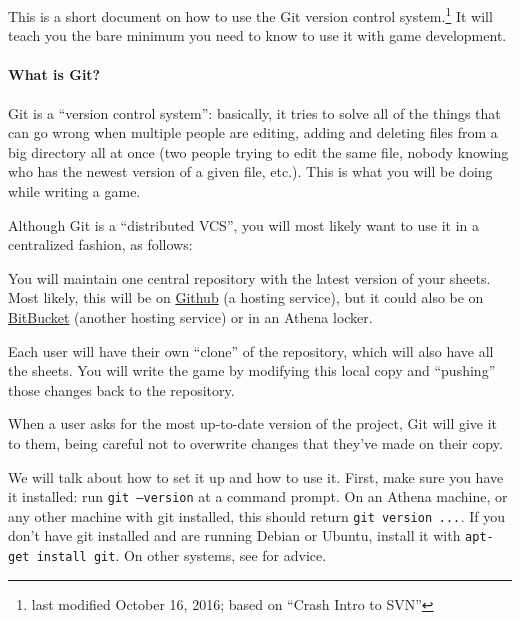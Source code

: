 \documentclass[green]{testgame}
\begin{document}
\newcommand{\ter}[1]{\fbox{\parbox{6.5in}{{\tt #1}}}}


This is a short document on how to use the Git version control
system.\footnote{last modified October 16, 2016; based on ``Crash Intro to SVN''} It will teach you the
bare minimum you need to know to use it with game development.

\paragraph*{What is Git?}

Git is a ``version control system'': basically,
it tries to solve all of the things that can go wrong when multiple
people are editing, adding and deleting files from a big directory all
at once (two people trying to edit the same file, nobody knowing who
has the newest version of a given file, etc.). This is what you will
be doing while writing a game.

Although Git is a ``distributed VCS'', you will most likely want to use it in a centralized fashion, as follows:


\begin{itemz}[]

\item You will maintain one central repository with the latest version of your sheets. Most likely, this will be on \href{https://github.com}{Github} (a hosting service), but it could also be on \href{https://bitbucket.org/}{BitBucket} (another hosting service) or in an Athena locker.

\item Each user will have their own ``clone'' of the repository, which will also have all the sheets. You will write the game by modifying this local copy and ``pushing'' those changes back to the repository.

\item When a user asks for the most up-to-date version of the project, Git will give it to them, being careful not to overwrite changes that they've made on their copy.

\end{itemz}

We will talk about how to set it up and how to use it. First, make sure you have it installed: run \texttt{git --version} at a command prompt. On an Athena machine, or any other machine with git installed, this should return \texttt{git version \textit{...}}. If you don't have git installed and are running Debian or Ubuntu, install it with \texttt{apt-get install git}. On other systems, see  for advice.
\end{document}
